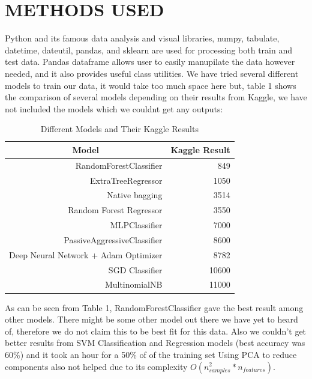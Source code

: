 \documentclass[a4paper, 10pt, conference]{ieeeconf}
\begin{document}
\section{METHODS USED}

Python and its famous data analysis and visual libraries, numpy, tabulate, datetime, dateutil, pandas, and sklearn are used for processing both train and test data. Pandas dataframe allows user to easily manupilate the data however needed, and it also provides useful class utilities.
\bigbreak
We have tried several different models to train our data, it would take too much space here but, table 1 shows the comparison of several models depending on their results from Kaggle, we have not included the models which we couldnt get any outputs:
\bigbreak

\begin{table}[h]
	\centering
	\begin{tabular}{|r|r|}
		\hline
		\multicolumn{1}{|c|}{Model} & \multicolumn{1}{c|}{Kaggle Result} \\ \hline
		RandomForestClassifier      & 849                                \\ \hline
		ExtraTreeRegressor          & 1050                               \\ \hline
		Native bagging              & 3514                               \\ \hline
		Random Forest Regressor     & 3550                               \\ \hline
		MLPClassifier               & 7000                               \\ \hline
		PassiveAggressiveClassifier & 8600                               \\ \hline
		Deep Neural Network + Adam Optimizer & 8782                      \\ \hline
		SGD Classifier              & 10600                              \\ \hline
		MultinomialNB               & 11000                              \\ \hline
	\end{tabular}
	\caption{Different Models and Their Kaggle Results}
	\label{my-label}
\end{table}

As can be seen from Table 1, RandomForestClassifier gave the best result among other models. There might be some other model out there we have yet to heard of, therefore we do not claim this to be best fit for this data. Also we couldn't get better results from SVM Classification and Regression models (best accuracy was 60\%) and it took an hour for a 50\% of of the training set Using PCA to reduce components also not helped due to its complexity $O(n_{samples}^2 * n_{features})$.
\end{document}
